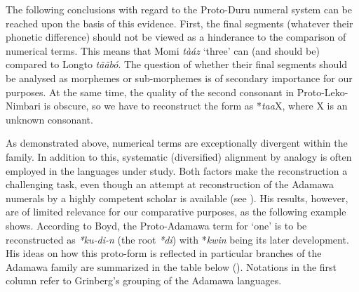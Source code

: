 The following conclusions with regard to the Proto-Duru numeral system can be reached upon the basis of this evidence. First, the final segments (whatever their phonetic difference) should not be viewed as a hinderance to the comparison of numerical terms. This means that Momi \textit{tàáz} ‘three’ can (and should be) compared to Longto \textit{t{\~{a}}{\~{a}}bó}. The question of whether their final segments should be analysed as morphemes or sub-morphemes is of secondary importance for our purposes. At the same time, the quality of the second consonant in Proto-Leko-Nimbari is obscure, so we have to reconstruct the form as *\textit{taa}X, where X is an unknown consonant.    

As demonstrated above, numerical terms are exceptionally divergent within the family. In addition to this, systematic (diversified) alignment by analogy is often employed in the languages under study. Both factors make the reconstruction a challenging task, even though an attempt at reconstruction of the Adamawa numerals by a highly competent scholar is available (see \citealt{Boyd1989}). His results, however, are of limited relevance for our comparative purposes, as the following example shows. According to Boyd, the Proto-Adamawa term for ‘one’ is to be reconstructed as \textit{*ku-di-n} (the root \textit{*di}) with *\textit{kwin} being its later development. His ideas on how this proto-form is reflected in particular branches of the Adamawa family are summarized in the table below (). Notations in the first column refer to Grinberg’s grouping of the Adamawa languages.

